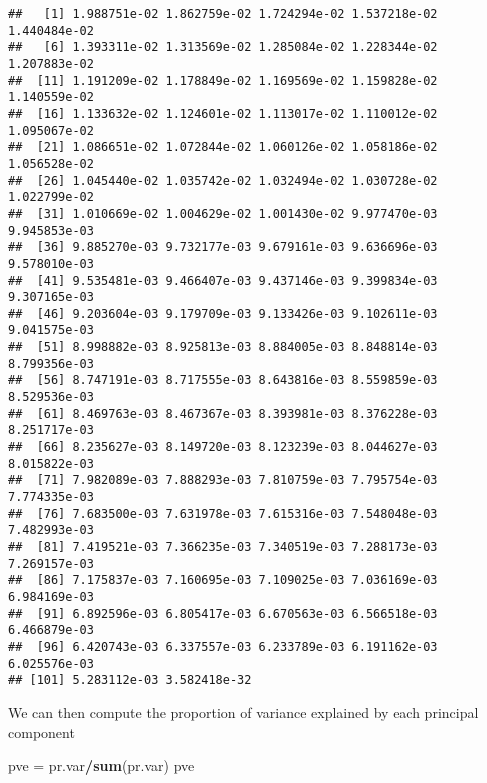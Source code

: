 \documentclass[]{article}
\newenvironment{Shaded}{\begin{snugshade}}{\end{snugshade}}
\newcommand{\KeywordTok}[1]{\textcolor[rgb]{0.13,0.29,0.53}{\textbf{#1}}}
\newcommand{\NormalTok}[1]{#1}
\newcommand{\OperatorTok}[1]{\textcolor[rgb]{0.81,0.36,0.00}{\textbf{#1}}}
\newcommand{\StringTok}[1]{\textcolor[rgb]{0.31,0.60,0.02}{#1}}
\begin{document}
\begin{verbatim}
##   [1] 1.988751e-02 1.862759e-02 1.724294e-02 1.537218e-02 1.440484e-02
##   [6] 1.393311e-02 1.313569e-02 1.285084e-02 1.228344e-02 1.207883e-02
##  [11] 1.191209e-02 1.178849e-02 1.169569e-02 1.159828e-02 1.140559e-02
##  [16] 1.133632e-02 1.124601e-02 1.113017e-02 1.110012e-02 1.095067e-02
##  [21] 1.086651e-02 1.072844e-02 1.060126e-02 1.058186e-02 1.056528e-02
##  [26] 1.045440e-02 1.035742e-02 1.032494e-02 1.030728e-02 1.022799e-02
##  [31] 1.010669e-02 1.004629e-02 1.001430e-02 9.977470e-03 9.945853e-03
##  [36] 9.885270e-03 9.732177e-03 9.679161e-03 9.636696e-03 9.578010e-03
##  [41] 9.535481e-03 9.466407e-03 9.437146e-03 9.399834e-03 9.307165e-03
##  [46] 9.203604e-03 9.179709e-03 9.133426e-03 9.102611e-03 9.041575e-03
##  [51] 8.998882e-03 8.925813e-03 8.884005e-03 8.848814e-03 8.799356e-03
##  [56] 8.747191e-03 8.717555e-03 8.643816e-03 8.559859e-03 8.529536e-03
##  [61] 8.469763e-03 8.467367e-03 8.393981e-03 8.376228e-03 8.251717e-03
##  [66] 8.235627e-03 8.149720e-03 8.123239e-03 8.044627e-03 8.015822e-03
##  [71] 7.982089e-03 7.888293e-03 7.810759e-03 7.795754e-03 7.774335e-03
##  [76] 7.683500e-03 7.631978e-03 7.615316e-03 7.548048e-03 7.482993e-03
##  [81] 7.419521e-03 7.366235e-03 7.340519e-03 7.288173e-03 7.269157e-03
##  [86] 7.175837e-03 7.160695e-03 7.109025e-03 7.036169e-03 6.984169e-03
##  [91] 6.892596e-03 6.805417e-03 6.670563e-03 6.566518e-03 6.466879e-03
##  [96] 6.420743e-03 6.337557e-03 6.233789e-03 6.191162e-03 6.025576e-03
## [101] 5.283112e-03 3.582418e-32
\end{verbatim}

We can then compute the proportion of variance explained by each
principal component

\begin{Shaded}
\begin{Highlighting}[]
\NormalTok{pve =}\StringTok{ }\NormalTok{pr.var}\OperatorTok{/}\KeywordTok{sum}\NormalTok{(pr.var)}
\NormalTok{pve}
\end{Highlighting}
\end{Shaded}
\end{document}
